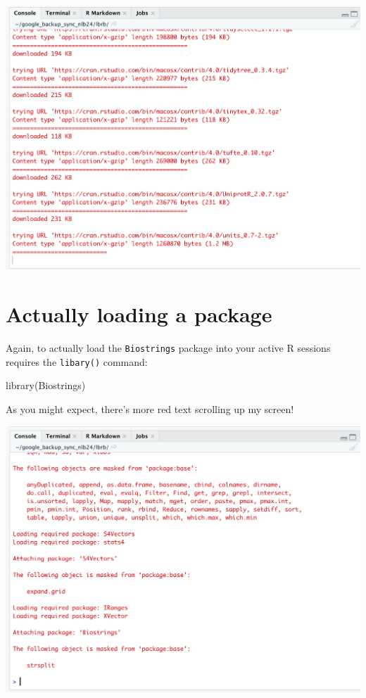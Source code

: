 \documentclass[
]{book}
\newenvironment{Shaded}{\begin{snugshade}}{\end{snugshade}}
\newcommand{\FunctionTok}[1]{\textcolor[rgb]{0.00,0.00,0.00}{#1}}
\newcommand{\NormalTok}[1]{#1}
\begin{document}
\includegraphics[width=20.25in]{images/angry_red_text_download_biostrings}

\hypertarget{actually-loading-a-package}{%
\section{Actually loading a package}\label{actually-loading-a-package}}

Again, to actually load the \texttt{Biostrings} package into your active R sessions requires the \texttt{libary()} command:

\begin{Shaded}
\begin{Highlighting}[]
\FunctionTok{library}\NormalTok{(Biostrings)}
\end{Highlighting}
\end{Shaded}

As you might expect, there's more red text scrolling up my screen!

\includegraphics[width=20.36in]{images/angry_red_text_library_biostrings}
\end{document}
